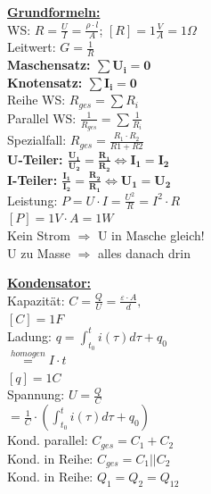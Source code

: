 \documentclass[11pt]{article}
\begin{document}
\begin{minipage}{0.33\textwidth}

\underline{\textbf{Grundformeln:}}\\
WS: $R = \frac{U}{I} = \frac{\rho \cdot l}{A}$; $[R] = 1\frac{V}{A} =1 \Omega$\\
Leitwert: $G = \frac{1}{R}$\\
\textbf{Maschensatz: $\mathbf{\sum U_i = 0}$\\}
\textbf{Knotensatz: $\mathbf{\sum I_i = 0}$\\}
Reihe WS: $R_{ges} = \sum R_i$\\
Parallel WS: $\frac{1}{R_{ges}} = \sum \frac{1}{R_i}$\\
\phantom{ss} Spezialfall: $R_{ges} = \frac{R_1 \cdot R_2}{R1+R2} $\\
\textbf{U-Teiler: $\mathbf{\frac{U_1}{U_2} = \frac{R_1}{R_2}\Leftrightarrow I_1 = I_2}$\\}
\textbf{I-Teiler: $\mathbf{\frac{I_1}{I_2} = \frac{R_2}{R_1}\Leftrightarrow U_1 = U_2}$\\}
Leistung: $P =U \cdot I = \frac{U^2}{R} = I^2 \cdot R $ \\
\phantom{ssssssssss} $[P] = 1V \cdot A =1 W$\\
Kein Strom $\Rightarrow$ U in Masche gleich!\\
U zu Masse $\Rightarrow$ alles danach drin

\underline{\textbf{Kondensator:}}\\
Kapazität: $C = \frac{Q}{U} = \frac{\varepsilon \cdot A }{d},$\\
\phantom{ssssssssssii} $[C]=1F$\\
Ladung: $q = \int_{t_0}^t i(\tau) d\tau + q_0$\\
\phantom{sssssssis} $\stackrel{homogen}{=} I \cdot t$\\
\phantom{ssssssssssii} $[q]=1C$\\
Spannung: $U = \frac{Q}{C}$\\
\phantom{ssi} $= \frac{1}{C} \cdot (\int_{t_0}^t i(\tau) d\tau + q_0)$\\
Kond. parallel: $C_{ges} = C_1 + C_2$\\
Kond. in Reihe: $C_{ges} = C_1 || C_2$\\
Kond. in Reihe: $Q_1 = Q_2 = Q_{12}$\\


\end{minipage}
\end{document}
